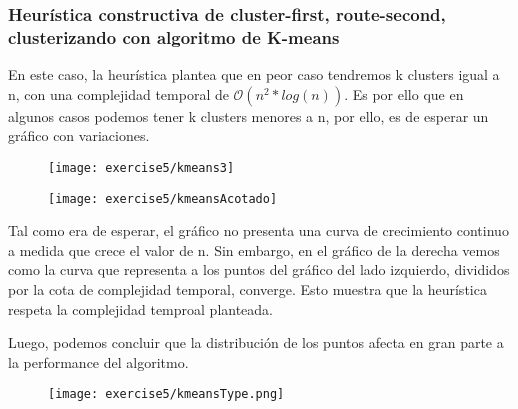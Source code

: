\subsubsection{Heurística constructiva de cluster-first, route-second, clusterizando con algoritmo de K-means}


En este caso, la heurística plantea que en peor caso tendremos k clusters igual a n, con una complejidad temporal de $\mathcal{O}(n^{2} * log(n))$. Es por ello que en algunos casos podemos tener k clusters menores a n, por ello, es de esperar un gráfico con variaciones.

\begin{figure}[H]
	\centering
	\begin{minipage}[t]{.45\textwidth}
		\centering
		\texttt{[image: exercise5/kmeans3]}
	\end{minipage}\qquad
	\begin{minipage}[t]{.45\textwidth}
		\centering
		\texttt{[image: exercise5/kmeansAcotado]}
	\end{minipage}
\end{figure}

Tal como era de esperar, el gráfico no presenta una curva de crecimiento continuo a medida que crece el valor de n. Sin embargo, en el gráfico de la derecha vemos como la curva que representa a los puntos del gráfico del lado izquierdo, divididos por la cota de complejidad temporal, converge. Esto muestra que la heurística respeta la complejidad temproal planteada.

Luego, podemos concluir que la distribución de los puntos afecta en gran parte a la performance del algoritmo.



\begin{figure}[H]
	\centering
	\texttt{[image: exercise5/kmeansType.png]}
\end{figure}